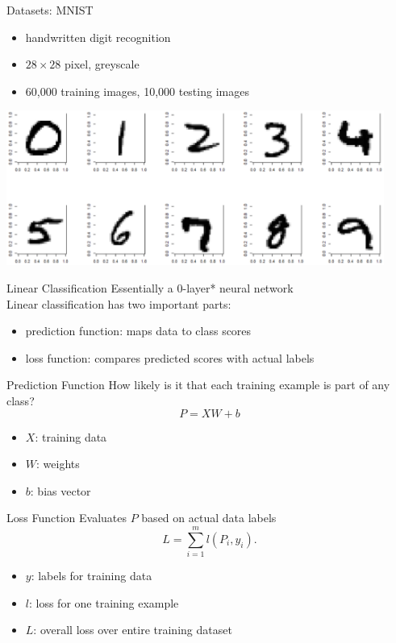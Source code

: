 \documentclass{beamer}
\begin{document}
  \begin{frame}{Datasets: MNIST}
    \begin{itemize}
      \item handwritten digit recognition
      \item $28 \times 28$ pixel, greyscale
      \item 60,000 training images, 10,000 testing images
    \end{itemize}
    \begin{center}
      \includegraphics[height=2in]{../figures/mnist.eps}
    \end{center}
  \end{frame}

  \begin{frame}{Linear Classification}
    Essentially a 0-layer* neural network\\
    Linear classification has two important parts:
    \begin{itemize}
      \item prediction function: maps data to class scores
      \item loss function: compares predicted scores with actual labels
    \end{itemize}
  \end{frame}

  \begin{frame}{Prediction Function}
    How likely is it that each training example is part of any class?
    $$ P = XW + b $$
    \begin{itemize}
      \item $X$: training data
      \item $W$: weights
      \item $b$: bias vector
    \end{itemize}
  \end{frame}

  \begin{frame}{Loss Function}
    Evaluates $P$ based on actual data labels
    $$ L = \sum_{i=1}^m l(P_i, y_i). $$
    \begin{itemize}
      \item $y$: labels for training data
      \item $l$: loss for one training example
      \item $L$: overall loss over entire training dataset
    \end{itemize}
  \end{frame}
\end{document}
